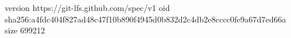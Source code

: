 version https://git-lfs.github.com/spec/v1
oid sha256:a4fdc404f827ad48c47f10b890f4945d0b832d2c4db2e8cccc0fe9a67d7ed66a
size 699212
